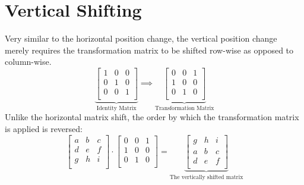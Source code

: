 \section{Vertical Shifting}

Very similar to the horizontal position change, the vertical position change
merely requires the transformation matrix to be shifted row-wise as opposed
to
column-wise.
\[
  \underbrace{
    \begin{bmatrix}
      1&0&0\\
      0&1&0\\
      0&0&1\\
    \end{bmatrix}
  }_{\text{Identity Matrix}}
  \implies
  \underbrace{
    \begin{bmatrix}
      0&0&1\\
      1&0&0\\
      0&1&0\\
    \end{bmatrix}
  }_{\text{Transformation
  Matrix}}
\]
Unlike the horizontal matrix shift, the order by which the transformation
matrix is applied is reversed:
\[ 
  \begin{bmatrix}
    a&b&c\\
    d&e&f\\
    g&h&i\\
  \end{bmatrix}
  \cdot
  \begin{bmatrix}
    0&0&1\\
    1&0&0\\
    0&1&0\\
  \end{bmatrix}
  =
  \underbrace{
    \begin{bmatrix}
    g&h&i\\
    a&b&c\\
    d&e&f\\
    \end{bmatrix}
  }_{\text{The
    vertically
    shifted
  matrix}}
\]

